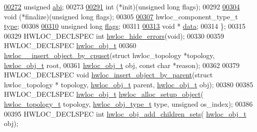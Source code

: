 \begin{DoxyCode}
\hyperlink{a00378_a3250bd6fc9713946991d805e48091b2e}{00272}   \textcolor{keywordtype}{unsigned} \hyperlink{a00378_a3250bd6fc9713946991d805e48091b2e}{abi};
00273 
\hyperlink{a00378_aea613546886d9b8221cadba920fe3ebc}{00291}   int (*init)(\textcolor{keywordtype}{unsigned} \textcolor{keywordtype}{long} flags);
00292 
\hyperlink{a00378_a4612015451a1c706e8ba19114cb8baae}{00304}   void (*finalize)(\textcolor{keywordtype}{unsigned} \textcolor{keywordtype}{long} flags);
00305 
\hyperlink{a00378_a789208ada7e17492cfd3a5a88a6bb0ee}{00307}   hwloc\_component\_type\_t \hyperlink{a00378_a789208ada7e17492cfd3a5a88a6bb0ee}{type};
00308 
\hyperlink{a00378_ab8043c5b4cc0e81aabba586ccb194335}{00310}   \textcolor{keywordtype}{unsigned} \textcolor{keywordtype}{long} \hyperlink{a00378_ab8043c5b4cc0e81aabba586ccb194335}{flags};
00311 
\hyperlink{a00378_a4b8cffd1d943c29fdc102b841b8598d4}{00313}   \textcolor{keywordtype}{void} * \hyperlink{a00378_a4b8cffd1d943c29fdc102b841b8598d4}{data};
00314 \};
00315 
00329 HWLOC\_DECLSPEC \textcolor{keywordtype}{int} \hyperlink{a00230_gab527c1e0f243f057d31a724794ad9f88}{hwloc\_hide\_errors}(\textcolor{keywordtype}{void});
00330 
00359 HWLOC\_DECLSPEC \hyperlink{a00238}{hwloc\_obj\_t}
00360 \hyperlink{a00230_ga1e105cfe3c8e77f34cc6df3841deebbc}{hwloc\_\_insert\_object\_by\_cpuset}(\textcolor{keyword}{struct} hwloc\_topology *topology, 
      \hyperlink{a00238}{hwloc\_obj\_t} root,
00361                                \hyperlink{a00238}{hwloc\_obj\_t} obj, \textcolor{keyword}{const} \textcolor{keywordtype}{char} *reason);
00362 
00379 HWLOC\_DECLSPEC \textcolor{keywordtype}{void} \hyperlink{a00230_ga0ef97debde503b56367689b07bb3e901}{hwloc\_insert\_object\_by\_parent}(\textcolor{keyword}{struct} hwloc\_topology *
      topology, \hyperlink{a00238}{hwloc\_obj\_t} parent, \hyperlink{a00238}{hwloc\_obj\_t} obj);
00380 
00385 HWLOC\_DECLSPEC \hyperlink{a00238}{hwloc\_obj\_t} \hyperlink{a00230_ga0b5c75b2dc37cea2e8a29c4812baf4b3}{hwloc\_alloc\_setup\_object}(
      \hyperlink{a00186_ga9d1e76ee15a7dee158b786c30b6a6e38}{hwloc\_topology\_t} topology, \hyperlink{a00184_gacd37bb612667dc437d66bfb175a8dc55}{hwloc\_obj\_type\_t} type, \textcolor{keywordtype}{unsigned} os\_index);
00386 
00395 HWLOC\_DECLSPEC \textcolor{keywordtype}{int} \hyperlink{a00230_ga754b61041ceee9685534a2c5d3cd0156}{hwloc\_obj\_add\_children\_sets}(
      \hyperlink{a00238}{hwloc\_obj\_t} obj);

\end{DoxyCode}
